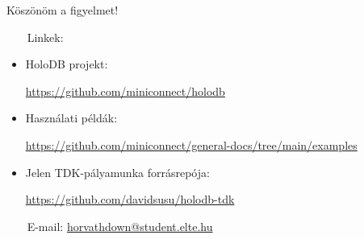 \documentclass[
    aspectratio=169,
]{beamer}
\begin{document}
\begin{frame}
    \vspace{1em}
    
    \centering
    
    { \Huge Köszönöm a figyelmet! }
    
    \vspace{3em}
    
    \hspace*{\fill}%
    \begin{minipage}[c]{0.75\textwidth}
        \begin{flushleft}
            \normalsize
            
            ~~~
            {\color{beamer@blendedblue}Linkek:}
            
            \vspace{0.5em}
            
            \footnotesize
            
            \begin{itemize}
                \item HoloDB projekt: \par
                    \url{https://github.com/miniconnect/holodb}
                \item Használati példák: \par
                    {\scriptsize{\url{https://github.com/miniconnect/general-docs/tree/main/examples}}}
                \item Jelen TDK-pályamunka forrásrepója: \par
                    \url{https://github.com/davidsusu/holodb-tdk}
            \end{itemize}
            
            \vspace{1.5em}
            
            \normalsize
            
            ~~~
            { \color{beamer@blendedblue} E-mail: }
            \href{mailto:horvathdown@student.elte.hu}{horvathdown@student.elte.hu}
        \end{flushleft}
    \end{minipage}%
    \hspace*{\fill}%
    \begin{minipage}[c]{0.24\textwidth}
    \end{minipage}%
    \hspace*{\fill}%
\end{frame}
\end{document}
